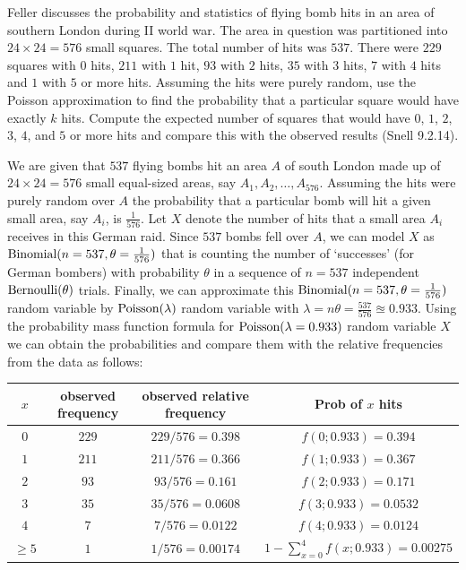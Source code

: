 \begin{Exercise}[title={Nazi Bombs on London},label={xbombsOnLondon}]
Feller discusses the probability and statistics of flying bomb hits in an area of southern London during II world war.  
The area in question was partitioned into $24 \times 24 = 576$ small squares.  
The total number of hits was $537$.  
There were $229$ squares with $0$ hits, $211$ with $1$ hit, $93$ with $2$ hits, $35$ with $3$ hits, $7$ with $4$ hits and $1$ with $5$ or more hits.  
Assuming the hits were purely random, use the Poisson approximation to find the probability that a particular square would have exactly $k$ hits.  Compute the expected number of squares that would have $0$, $1$, $2$, $3$, $4$, and $5$ or more hits and compare this with the observed results (Snell 9.2.14).  
\end{Exercise}

\begin{Answer}
We are given that $537$ flying bombs hit an area $A$ of south London made up of $24 \times 24=576$ small equal-sized areas, say $A_1,A_2,\ldots,A_{576}$.  
Assuming the hits were purely random over $A$ the probability that a particular bomb will hit a given small area, say $A_i$, is $\frac{1}{576}$.  
Let $X$ denote the number of hits that a small area $A_i$ receives in this German raid.  
Since $537$ bombs fell over $A$, we can model $X$ as $\mbox{{\rm Binomial}}(n=537,\theta=\frac{1}{576})$ that is counting the number of `successes' (for German bombers) with probability $\theta$ in a sequence of $n=537$ independent $\mbox{{\rm Bernoulli}}(\theta)$ trials.  
Finally, we can approximate this $\mbox{{\rm Binomial}}(n=537,\theta=\frac{1}{576})$ random variable by $\mbox{{\rm Poisson}}(\lambda)$ random variable with $\lambda=n\theta=\frac{537}{576} \approxeq 0.933$.
Using the probability mass function formula for $\mbox{{\rm Poisson}}(\lambda=0.933)$ random variable $X$ we can obtain the probabilities and compare them with the relative frequencies from the data as follows:

\begin{center}
{\small
\begin{tabular}{|c|c|c|c|}
\hline
$x$ & observed frequency & observed relative frequency & Prob of $x$ hits\\\hline
$0$ & $229$ & $229/576=0.398$ & $f(0;0.933) = 0.394$\\
$1$ & $211$ & $211/576=0.366$ & $f(1;0.933) = 0.367$\\
$2$ & $93$ & $93/576=0.161$ & $f(2;0.933) = 0.171$\\
$3$ & $35$ & $35/576=0.0608$ & $f(3;0.933) = 0.0532$\\
$4$ & $7$ & $7/576=0.0122$ & $f(4;0.933) = 0.0124$\\
$\geq 5$ & $1$ & $1/576=0.00174$ & $1-\sum_{x=0}^4f(x;0.933) = 0.00275$\\\hline
\end{tabular}
}
\end{center}
\end{Answer}

